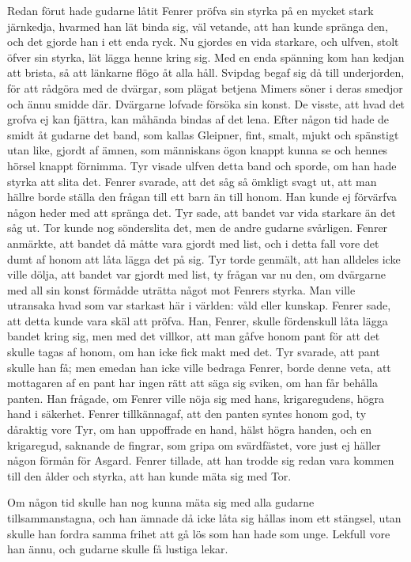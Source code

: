 Redan förut hade gudarne låtit Fenrer pröfva sin styrka på en mycket
stark järnkedja, hvarmed han lät binda sig, väl vetande, att han kunde
spränga den, och det gjorde han i ett enda ryck. Nu gjordes en vida
starkare, och ulfven, stolt öfver sin styrka, lät lägga henne kring sig.
Med en
enda spänning kom han kedjan att brista, så att länkarne flögo åt alla
håll. Svipdag begaf sig då till underjorden, för att rådgöra med de
dvärgar, som plägat betjena Mimers söner i deras smedjor och ännu smidde
där. Dvärgarne lofvade försöka sin konst. De visste, att hvad det grofva
ej kan fjättra, kan måhända bindas af det lena. Efter någon tid hade de
smidt åt gudarne det band, som kallas Gleipner, fint, smalt, mjukt och
spänstigt utan like, gjordt af ämnen, som människans ögon knappt kunna
se och hennes hörsel knappt förnimma. Tyr visade ulfven detta band och
sporde, om han hade styrka att slita det. Fenrer svarade, att det såg så
ömkligt svagt ut, att man hällre borde ställa den frågan till ett barn
än till honom. Han kunde ej förvärfva någon heder med att spränga det.
Tyr sade, att bandet var vida starkare än det såg ut. Tor kunde nog
sönderslita det, men de andre gudarne svårligen. Fenrer anmärkte, att
bandet då måtte vara gjordt med list, och i detta fall vore det dumt af
honom att låta lägga det på sig. Tyr torde genmält, att han alldeles
icke ville dölja, att bandet var gjordt med list, ty frågan var nu den,
om dvärgarne med all sin konst förmådde uträtta något mot Fenrers
styrka. Man ville utransaka hvad som var starkast här i världen: våld
eller kunskap. Fenrer sade, att detta kunde vara skäl att pröfva. Han,
Fenrer, skulle fördenskull låta lägga bandet kring sig, men med det
villkor, att man gåfve honom pant för att det skulle tagas af honom, om
han icke fick makt med det. Tyr svarade, att pant skulle han få; men
emedan han icke ville bedraga Fenrer, borde denne veta, att mottagaren
af en pant har ingen rätt att säga sig sviken, om han får behålla
panten. Han frågade, om Fenrer ville nöja sig med hans, krigaregudens,
högra hand i säkerhet. Fenrer tillkännagaf, att den panten syntes honom
god, ty dåraktig vore Tyr, om han uppoffrade en hand, hälst högra
handen, och en krigaregud, saknande de fingrar, som gripa om
svärdfästet, vore just ej häller någon förmån för Asgard. Fenrer
tillade, att han trodde sig redan vara kommen till den ålder och styrka,
att han kunde mäta sig med Tor.

Om någon tid skulle han nog kunna mäta sig med alla gudarne
tillsammanstagna, och han ämnade då icke låta sig hållas inom ett
stängsel, utan skulle han fordra samma frihet att gå lös som han hade
som unge. Lekfull vore han ännu, och gudarne skulle få lustiga lekar.

